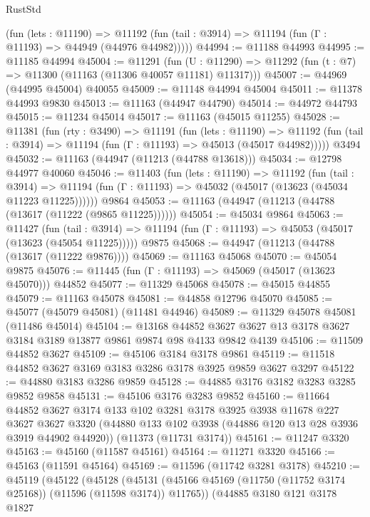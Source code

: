 \begin{lexlean}{RustStd}
\begin{coremodule}
      (fun (lets : @11190) =>
      @11192 (fun (tail : @3914) => @11194 (fun (Γ : @11193) => @44949 (@44976 @44982)))))
@44994 := @11188 @44993
@44995 := @11185 @44994
@45004 := @11291
    (fun (U : @11290) => @11292 (fun (t : @7) => @11300 (@11163 (@11306 @40057 @11181) @11317)))
@45007 := @44969 (@44995 @45004) @40055
@45009 := @11148 @44994 @45004
@45011 := @11378 @44993 @9830
@45013 := @11163 (@44947 @44790)
@45014 := @44972 @44793
@45015 := @11234 @45014
@45017 := @11163 (@45015 @11255)
@45028 := @11381
    (fun (rty : @3490) =>
    @11191
      (fun (lets : @11190) =>
      @11192 (fun (tail : @3914) => @11194 (fun (Γ : @11193) => @45013 (@45017 @44982)))))
    @3494
@45032 := @11163 (@44947 (@11213 (@44788 @13618)))
@45034 := @12798 @44977 @40060
@45046 := @11403
    (fun (lets : @11190) =>
    @11192
      (fun (tail : @3914) =>
      @11194 (fun (Γ : @11193) => @45032 (@45017 (@13623 (@45034 @11223 @11225))))))
    @9864
@45053 := @11163 (@44947 (@11213 (@44788 (@13617 (@11222 (@9865 @11225))))))
@45054 := @45034 @9864
@45063 := @11427
    (fun (tail : @3914) => @11194 (fun (Γ : @11193) => @45053 (@45017 (@13623 (@45054 @11225)))))
    @9875
@45068 := @44947 (@11213 (@44788 (@13617 (@11222 @9876))))
@45069 := @11163 @45068
@45070 := @45054 @9875
@45076 := @11445 (fun (Γ : @11193) => @45069 (@45017 (@13623 @45070))) @44852
@45077 := @11329 @45068
@45078 := @45015 @44855
@45079 := @11163 @45078
@45081 := @44858 @12796 @45070
@45085 := @45077 (@45079 @45081) (@11481 @44946)
@45089 := @11329 @45078 @45081 (@11486 @45014)
@45104 := @13168
    @44852
    @3627
    @3627
    @13
    @3178
    @3627
    @3184
    @3189
    @13877
    @9861
    @9874
    @98
    @4133
    @9842
    @4139
@45106 := @11509 @44852 @3627
@45109 := @45106 @3184 @3178 @9861
@45119 := @11518 @44852 @3627 @3169 @3183 @3286 @3178 @3925 @9859 @3627 @3297
@45122 := @44880 @3183 @3286 @9859
@45128 := @44885 @3176 @3182 @3283 @3285 @9852 @9858
@45131 := @45106 @3176 @3283 @9852
@45160 := @11664
    @44852
    @3627
    @3174
    @133
    @102
    @3281
    @3178
    @3925
    @3938
    @11678
    @227
    @3627
    @3627
    @3320
    (@44880 @133 @102 @3938 (@44886 @120 @13 @28 @3936 @3919 @44902 @44920))
    (@11373 (@11731 @3174))
@45161 := @11247 @3320
@45163 := @45160 (@11587 @45161)
@45164 := @11271 @3320
@45166 := @45163 (@11591 @45164)
@45169 := @11596 (@11742 @3281 @3178)
@45210 := @45119
    (@45122
      (@45128
        (@45131 (@45166 @45169 (@11750 (@11752 @3174 @25168)) (@11596 (@11598 @3174)) @11765))
        (@44885
          @3180
          @121
          @3178
          @1827

\end{coremodule}
\end{lexlean}
